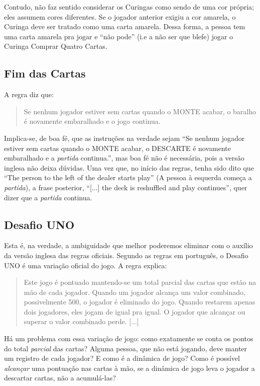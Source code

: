 Contudo, não faz sentido considerar os Curingas como sendo de uma cor própria; eles assumem cores diferentes. Se o jogador anterior exigiu a cor amarela, o Curinga deve ser tratado como uma carta amarela. Dessa forma, a pessoa tem uma carta amarela pra jogar e ``não pode'' (i.e a não ser que blefe) jogar o Curinga Comprar Quatro Cartas.

\subsection{Fim das Cartas}

A regra diz que:

\begin{quote}
Se nenhum jogador estiver sem cartas quando o MONTE acabar, o baralho é novamente embaralhado e o jogo continua.
\end{quote}

Implica-se, de boa fé, que as instruções na verdade sejam ``Se nenhum jogador estiver sem cartas quando o MONTE acabar, o DESCARTE é novamente embaralhado e a \textit{partida} continua.'', mas boa fé não é necessária, pois a versão inglesa não deixa dúvidas. Uma vez que, no início das regras, tenha sido dito que ``The person to the left of the dealer starts play'' (A pessoa à esquerda começa a \emph{partida}), a frase posterior, ``[...] the deck is reshuffled and play continues'', quer dizer que a \emph{partida} continua.

\subsection{Desafio UNO}

Esta é, na verdade, a ambiguidade que melhor poderemos eliminar com o auxílio da versão inglesa das regras oficiais. Segundo as regras em português, o Desafio UNO é uma variação oficial do jogo. A regra explica:

\begin{quote}
Este jogo é pontuado mantendo-se um total parcial das cartas que estão na mão de cada jogador. Quando um jogador alcança um valor combinado, possivelmente 500, o jogador é eliminado do jogo. Quando restarem apenas dois jogadores, eles jogam de igual pra igual. O jogador que alcançar ou superar o valor combinado perde. [...]
\end{quote}

Há um problema com essa variação de jogo: como exatamente se conta os pontos do total \textit{parcial} das cartas? Alguma pessoa, que não está jogando, deve manter um registro de cada jogador? E como é a dinâmica de jogo? Como é possível \textit{alcançar} uma pontuação nas cartas à mão, se a dinâmica de jogo leva o jogador a descartar cartas, não a acumulá-las? 

